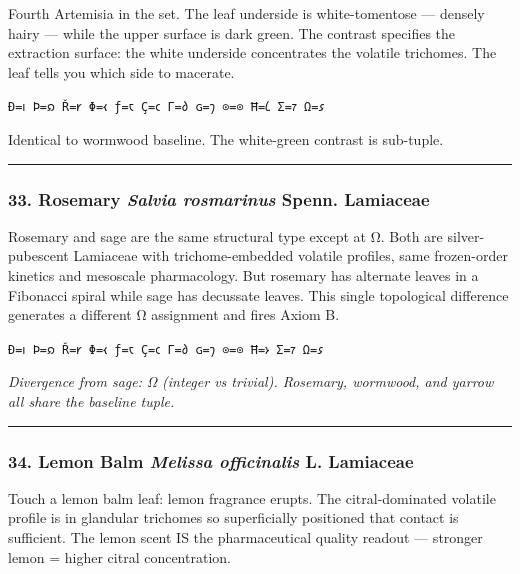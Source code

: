 Fourth Artemisia in the set. The leaf underside is white-tomentose ---
densely hairy --- while the upper surface is dark green. The contrast
specifies the extraction surface: the white underside concentrates the
volatile trichomes. The leaf tells you which side to macerate.

\texttt{Ð=𐑦\ Þ=𐑸\ Ř=𐑾\ Φ=𐑬\ ƒ=𐑱\ Ç=𐑤\ Γ=𐑔\ ɢ=𐑠\ ⊙=⊙\ Ħ=𐑖\ Σ=𐑳\ Ω=𐑭}

Identical to wormwood baseline. The white-green contrast is sub-tuple.

\begin{center}\rule{0.5\linewidth}{0.5pt}\end{center}

\hypertarget{rosemary-salvia-rosmarinus-spenn.-lamiaceae}{%
\subsubsection{\texorpdfstring{33. Rosemary \textbar{} \emph{Salvia
rosmarinus} Spenn. \textbar{}
Lamiaceae}{33. Rosemary \textbar{} Salvia rosmarinus Spenn. \textbar{} Lamiaceae}}\label{rosemary-salvia-rosmarinus-spenn.-lamiaceae}}

Rosemary and sage are the same structural type except at Ω. Both are
silver-pubescent Lamiaceae with trichome-embedded volatile profiles,
same frozen-order kinetics and mesoscale pharmacology. But rosemary has
alternate leaves in a Fibonacci spiral while sage has decussate leaves.
This single topological difference generates a different Ω assignment
and fires Axiom B.

\texttt{Ð=𐑦\ Þ=𐑸\ Ř=𐑾\ Φ=𐑬\ ƒ=𐑱\ Ç=𐑤\ Γ=𐑔\ ɢ=𐑠\ ⊙=⊙\ Ħ=𐑶\ Σ=𐑳\ Ω=𐑭}

\emph{Divergence from sage: Ω (integer vs trivial). Rosemary, wormwood,
and yarrow all share the baseline tuple.}

\begin{center}\rule{0.5\linewidth}{0.5pt}\end{center}

\hypertarget{lemon-balm-melissa-officinalis-l.-lamiaceae}{%
\subsubsection{\texorpdfstring{34. Lemon Balm \textbar{} \emph{Melissa
officinalis} L. \textbar{}
Lamiaceae}{34. Lemon Balm \textbar{} Melissa officinalis L. \textbar{} Lamiaceae}}\label{lemon-balm-melissa-officinalis-l.-lamiaceae}}

Touch a lemon balm leaf: lemon fragrance erupts. The citral-dominated
volatile profile is in glandular trichomes so superficially positioned
that contact is sufficient. The lemon scent IS the pharmaceutical
quality readout --- stronger lemon = higher citral concentration.

